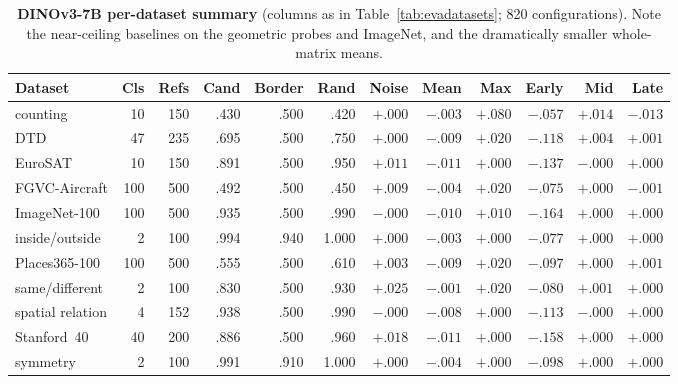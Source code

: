\documentclass{article}
\newcommand{\dino}{DINOv3-7B}
\begin{document}
\begin{table}[h]
\caption{\textbf{\dino{} per-dataset summary} (columns as in
Table~\ref{tab:evadatasets}; 820 configurations). Note the near-ceiling
baselines on the geometric probes and ImageNet, and the dramatically
smaller whole-matrix means.}
\label{tab:dinodatasets}
\centering
\scriptsize
\setlength{\tabcolsep}{3.4pt}
\begin{tabular}{lrrrrrrrrrrr}
\toprule
Dataset & Cls & Refs & Cand & Border & Rand & Noise & Mean & Max & Early & Mid & Late \\
\midrule
counting & 10 & 150 & .430 & .500 & .420 & $+.000$ & $-.003$ & $+.080$ & $-.057$ & $+.014$ & $-.013$ \\
DTD & 47 & 235 & .695 & .500 & .750 & $+.000$ & $-.009$ & $+.020$ & $-.118$ & $+.004$ & $+.001$ \\
EuroSAT & 10 & 150 & .891 & .500 & .950 & $+.011$ & $-.011$ & $+.000$ & $-.137$ & $-.000$ & $+.000$ \\
FGVC-Aircraft & 100 & 500 & .492 & .500 & .450 & $+.009$ & $-.004$ & $+.020$ & $-.075$ & $+.000$ & $-.001$ \\
ImageNet-100 & 100 & 500 & .935 & .500 & .990 & $-.000$ & $-.010$ & $+.010$ & $-.164$ & $+.000$ & $+.000$ \\
inside/outside & 2 & 100 & .994 & .940 & 1.000 & $+.000$ & $-.003$ & $+.000$ & $-.077$ & $+.000$ & $+.000$ \\
Places365-100 & 100 & 500 & .555 & .500 & .610 & $+.003$ & $-.009$ & $+.020$ & $-.097$ & $+.000$ & $+.001$ \\
same/different & 2 & 100 & .830 & .500 & .930 & $+.025$ & $-.001$ & $+.020$ & $-.080$ & $+.001$ & $+.000$ \\
spatial relation & 4 & 152 & .938 & .500 & .990 & $-.000$ & $-.008$ & $+.000$ & $-.113$ & $-.000$ & $+.000$ \\
Stanford~40 & 40 & 200 & .886 & .500 & .960 & $+.018$ & $-.011$ & $+.000$ & $-.158$ & $+.000$ & $+.000$ \\
symmetry & 2 & 100 & .991 & .910 & 1.000 & $+.000$ & $-.004$ & $+.000$ & $-.098$ & $+.000$ & $+.000$ \\
\bottomrule
\end{tabular}
\end{table}
\end{document}
